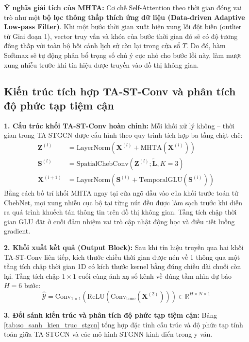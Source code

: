 \textbf{Ý nghĩa giải tích của MHTA:} Cơ chế Self-Attention theo thời gian đóng vai trò như một \textbf{bộ lọc thông thấp thích ứng dữ liệu (Data-driven Adaptive Low-pass Filter)}. Khi một bước thời gian xuất hiện xung lỗi đột biến (outlier từ Giai đoạn 1), vector truy vấn và khóa của bước thời gian đó sẽ có độ tương đồng thấp với toàn bộ bối cảnh lịch sử còn lại trong cửa sổ $T$. Do đó, hàm Softmax sẽ tự động phân bổ trọng số chú ý cực nhỏ cho bước lỗi này, làm mượt xung nhiễu trước khi tín hiệu được truyền vào đồ thị không gian.

\subsection{Kiến trúc tích hợp TA-ST-Conv và phân tích độ phức tạp tiệm cận}
\label{sec:kien_truc_stgcn_tieu_chuan}

\textbf{1. Cấu trúc khối TA-ST-Conv hoàn chỉnh:}
Mỗi khối xử lý không -- thời gian trong TA-STGCN được cấu hình theo quy trình tích hợp ba tầng chặt chẽ:
\begin{align}
    \mathbf{Z}^{(l)} &= \text{LayerNorm}\left( \mathbf{X}^{(l)} + \text{MHTA}(\mathbf{X}^{(l)}) \right) \\
    \mathbf{S}^{(l)} &= \text{SpatialChebConv}\left( \mathbf{Z}^{(l)}; \tilde{\mathbf{L}}, K=3 \right) \\
    \mathbf{X}^{(l+1)} &= \text{LayerNorm}\left( \mathbf{S}^{(l)} + \text{TemporalGLU}(\mathbf{S}^{(l)}) \right)
\end{align}
Bằng cách bố trí khối MHTA ngay tại cửa ngõ đầu vào của khối trước toán tử ChebNet, mọi xung nhiễu cục bộ tại từng nút đều được làm sạch trước khi diễn ra quá trình khuếch tán thông tin trên đồ thị không gian. Tầng tích chập thời gian GLU đặt ở cuối đảm nhiệm vai trò cập nhật động học và điều tiết luồng gradient.

\textbf{2. Khối xuất kết quả (Output Block):}
Sau khi tín hiệu truyền qua hai khối TA-ST-Conv liên tiếp, kích thước chiều thời gian được nén về 1 thông qua một tầng tích chập thời gian 1D có kích thước kernel bằng đúng chiều dài chuỗi còn lại. Tầng tích chập $1 \times 1$ cuối cùng ánh xạ số kênh về đúng tầm nhìn dự báo $H = 6$ bước:
\begin{equation}
    \hat{\mathcal{Y}} = \text{Conv}_{1 \times 1}\left( \text{ReLU}\left( \text{Conv}_{\text{time}}(\mathbf{X}^{(2)}) \right) \right) \in \mathbb{R}^{H \times N \times 1}
\end{equation}

\textbf{3. Đối sánh kiến trúc và phân tích độ phức tạp tiệm cận:}
Bảng \ref{tab:so_sanh_kien_truc_stgcn} tổng hợp đặc tính cấu trúc và độ phức tạp tính toán giữa TA-STGCN và các mô hình STGNN kinh điển trong y văn.

